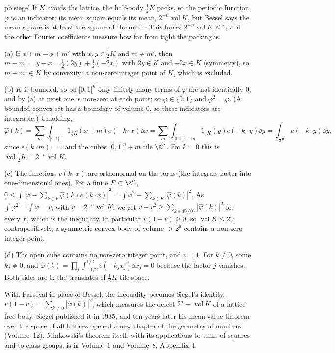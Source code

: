 \begin{solution}{pb:siegel}
\idea If $K$ avoids the lattice, the half-body $\frac12K$ packs, so the periodic function $\varphi$ is an indicator; its mean square equals its
mean, $2^{-n}\operatorname{vol}K$, but Bessel says the mean square is at least the square of the mean. This forces $2^{-n}\operatorname{vol}K\le1$, and the other Fourier
coefficients measure how far from tight the packing is.

\writeup (a) If $x+m=y+m'$ with $x,y\in\frac12K$ and $m\ne m'$, then $m-m'=y-x=\frac12(2y)+\frac12(-2x)$ with $2y\in K$ and $-2x\in K$ (symmetry), so
$m-m'\in K$ by convexity: a non-zero integer point of $K$, which is excluded.

(b) $K$ is bounded, so on $[0,1[^n$ only finitely many terms of $\varphi$ are not identically $0$, and by (a) at most one is non-zero at each point; so
$\varphi\in\{0,1\}$ and $\varphi^2=\varphi$. (A bounded convex set has a boundary of volume $0$, so these indicators are integrable.) Unfolding,
\[
\hat\varphi(k)=\sum_m\int_{[0,1[^n}1_{\frac12K}(x+m)e(-k\cdot x)\dd x=\sum_m\int_{[0,1[^n+m}1_{\frac12K}(y)e(-k\cdot y)\dd y=\int_{\frac12K}e(-k\cdot y)\dd y,
\]
since $e(k\cdot m)=1$ and the cubes $[0,1[^n+m$ tile $\R^n$. For $k=0$ this is $\operatorname{vol}\frac12K=2^{-n}\operatorname{vol}K$.

(c) The functions $e(k\cdot x)$ are orthonormal on the torus (the integrals factor into one-dimensional ones). For a finite $F\subset\Z^n$,
$0\le\int|\varphi-\sum_{k\in F}\hat\varphi(k)e(k\cdot x)|^2=\int\varphi^2-\sum_{k\in F}|\hat\varphi(k)|^2$. As $\int\varphi^2=\int\varphi=v$, with $v=2^{-n}\operatorname{vol}K$, we get
$v-v^2\ge\sum_{k\in F\setminus\{0\}}|\hat\varphi(k)|^2$ for every $F$, which is the inequality. In particular $v(1-v)\ge0$, so $\operatorname{vol}K\le2^n$; contrapositively, a symmetric
convex body of volume $>2^n$ contains a non-zero integer point.

(d) The open cube contains no non-zero integer point, and $v=1$. For $k\ne0$, some $k_j\ne0$, and $\hat\varphi(k)=\prod_j\int_{-1/2}^{1/2}e(-k_jx_j)\dd x_j=0$ because the
factor $j$ vanishes. Both sides are $0$: the translates of $\frac12K$ tile space.

\leads With Parseval in place of Bessel, the inequality becomes Siegel's identity, $v(1-v)=\sum_{k\ne0}|\hat\varphi(k)|^2$, which measures the defect $2^n-\operatorname{vol}K$
of a lattice-free body. Siegel published it in 1935, and ten years later his mean value theorem over the space of all lattices
opened a new chapter of the geometry of numbers (Volume~12). Minkowski's theorem itself, with its applications to sums of squares and
to class groups, is in Volume~1 and Volume~8, Appendix~I.
\end{solution}

